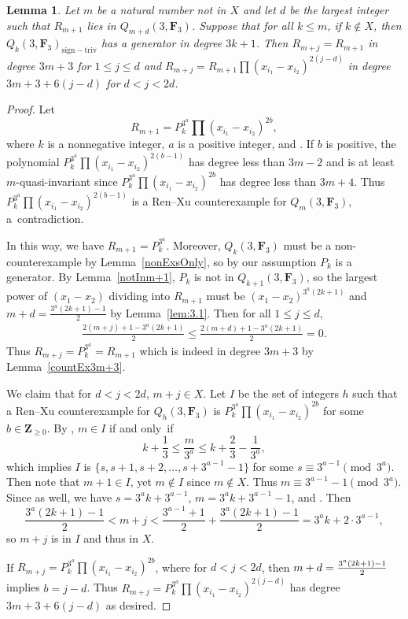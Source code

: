 \documentclass[11pt]{article}
\numberwithin{equation}{section}
\newtheorem{Lemma}[Theorem]{Lemma}
\theoremstyle{definition}
\numberwithin{equation}{section}
\newcommand{\siv}{\mathrm{sign-triv}}
\begin{document}
\begin{Lemma}\label{staircase}
 Let $m$ be a natural number not in $X$ and let $d$ be the largest integer such that $R_{m+1}$ lies in $Q_{m+d}(3,\mathbf{F}_3)$. Suppose that for all $k\leq m$, if $k\not\in X$, then $Q_k(3,\mathbf{F}_3)_\siv$ has a generator in degree $3k+1$. Then $R_{m+j}=R_{m+1}$ in degree $3m+3$ for $1\leq j\leq d$ and $R_{m+j}=R_{m+1}\prod (x_{i_1}-x_{i_2})^{2(j-d)}$ in degree $3m+3+6(j-d)$ for $d< j<2d$.
\end{Lemma}
\begin{proof}
 Let
 \[
 R_{m+1}=P_k^{3^a}\prod(x_{i_1}-x_{i_2})^{2b},
 \]
 where $k$ is a nonnegative integer, $a$ is a positive integer, and . If $b$ is positive, the polynomial $P_k^{3^a}\prod(x_{i_1}-x_{i_2})^{2(b-1)}$ has degree less than $3m-2$ and is at least $m$-quasi-invariant since $P_k^{3^a}\prod(x_{i_1}-x_{i_2})^{2b}$ has degree less than $3m+4$. Thus $P_k^{3^a}\prod(x_{i_1}-x_{i_2})^{2(b-1)}$ is a Ren--Xu counterexample for $Q_m(3,\mathbf{F}_3)$, a~contradiction.

 In this way, we have $R_{m+1}=P_k^{3^a}$. Moreover, $Q_k(3,\mathbf{F}_3)$ must be a non-counterexample by Lemma~\ref{nonExsOnly}, so by our assumption $P_k$ is a generator. By Lemma~\ref{notInm+1}, $P_k$ is not in $Q_{k+1}(3,\mathbf{F}_3)$, so the largest power of $(x_1-x_2)$ dividing into $R_{m+1}$ must be $(x_1-x_2)^{3^a(2k+1)}$ and $m+d=\frac{3^a(2k+1)-1}{2}$ by Lemma~\ref{lem:3.1}. Then for all $1\leq j\leq d$,
 \begin{align*}
 \frac{2(m+j)+1-3^a(2k+1)}{2} \leq \frac{2(m+d)+1-3^a(2k+1)}{2}= 0.
 \end{align*}
 Thus $R_{m+j}=P_k^{3^a}=R_{m+1}$ which is indeed in degree $3m+3$ by Lemma~\ref{countEx3m+3}.

 We claim that for $d<j< 2d$, $m+j\in X$. Let $I$ be the set of integers $h$ such that a Ren--Xu counterexample for $Q_h(3,\mathbf{F}_3)$ is $P_k^{3^a}\prod(x_{i_1}-x_{i_2})^{2b}$ for some $b\in \mathbf{Z}_{\geq 0}$. By \cite{Ren_2020}, $m\in I$ if and only~if
 \[k+\frac{1}{3}\leq \frac{m}{3^a}\leq k+\frac{2}{3}-\frac{1}{3^a},\]
 which implies $I$ is $\bigl\{s,s+1,s+2,\ldots,s+3^{a-1}-1\bigr\}$ for some $s\equiv 3^{a-1} \pmod{3^a}$. Then note that $m+1\in I$, yet $m\not\in I$ since $m\not\in X$. Thus $m\equiv 3^{a-1}-1\pmod{3^a}$. Since  as well, we have $s=3^ak+3^{a-1}$, $m=3^ak+3^{a-1}-1$, and . Then
 \[\frac{3^a(2k+1)-1}{2}< m+j< \frac{3^{a-1}+1}{2}+ \frac{3^a(2k+1)-1}{2} = 3^ak+2\cdot 3^{a-1},\]
 so $m+j$ is in $I$ and thus in $X$.

If $R_{m+j}=P_k^{3^a}\prod(x_{i_1}-x_{i_2})^{2b}$, where  for $d<j< 2d$, then $m+d=\smash{\frac{3^a(2k+1)-1}{2}}$ implies $b=j-d$. Thus $R_{m+j}=P_k^{3^a}\prod(x_{i_1}-x_{i_2})^{2(j-d)}$ has degree $3m+3+6(j-d)$ as desired.
\end{proof}
\end{document}
